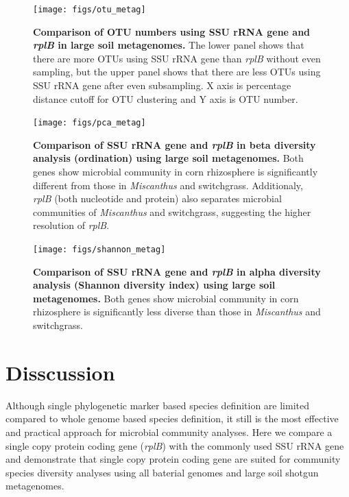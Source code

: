 \documentclass[]{msu-thesis}
\begin{document}
\begin{figure}[tbph!]
  \centering
  \texttt{[image: figs/otu\_metag]}
  \caption[Comparison of OTU numbers using SSU rRNA gene and \textit{rplB} in large soil metagenomes]{\textbf{Comparison of OTU numbers using SSU rRNA gene and \textit{rplB} in large soil metagenomes.} The lower panel shows that there are more OTUs using SSU rRNA gene than \textit{rplB} without even sampling, but the upper panel shows that there are less OTUs using SSU rRNA gene after even subsampling. X axis is percentage distance cutoff for OTU clustering and Y axis is OTU number.}
  \label{fig:otuMetag}
\end{figure}


\begin{figure}[tbph!]
  \centering
  \texttt{[image: figs/pca\_metag]}
  \caption[Comparison of SSU rRNA gene and \textit{rplB} in beta diversity analysis (ordination) using large soil metagenomes]{\textbf{Comparison of SSU rRNA gene and \textit{rplB} in beta diversity analysis (ordination) using large soil metagenomes.} Both genes show microbial community in corn rhizosphere is significantly different from those in \textit{Miscanthus} and switchgrass. Additionaly, \textit{rplB} (both nucleotide and protein) also separates microbial communities of \textit{Miscanthus} and switchgrass, suggesting the higher resolution of \textit{rplB}.}
  \label{fig:pcaMetag}
\end{figure}


\begin{figure}[tbph!]
  \centering
  \texttt{[image: figs/shannon\_metag]}
  \caption[Comparison of SSU rRNA gene and \textit{rplB} in alpha diversity analysis (Shannon diversity index) using large soil metagenomes]{\textbf{Comparison of SSU rRNA gene and \textit{rplB} in alpha diversity analysis (Shannon diversity index) using large soil metagenomes.} Both genes show microbial community in corn rhizosphere is significantly less diverse than those in \textit{Miscanthus} and switchgrass.}
  \label{fig:shannonMetag}
\end{figure}


\section{Disscussion}

Although single phylogenetic marker based species definition are limited compared to whole genome based species definition, it still is the most effective and practical approach for microbial community analyses. Here we compare a single copy protein coding gene (\textit{rplB}) with the commonly used SSU rRNA gene and demonstrate that single copy protein coding gene are suited for community species diversity analyses using all baterial genomes and large soil shotgun metagenomes.
\end{document}
